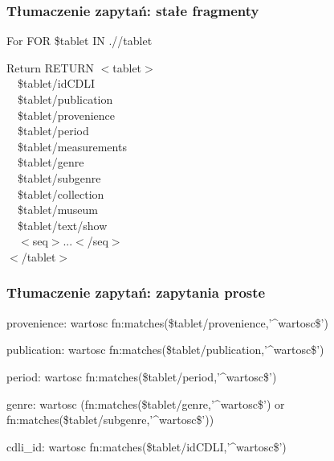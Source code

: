 \begin{frame}
 \frametitle{Tłumaczenie zapytań: stałe fragmenty}
  \begin{block}{For}
	FOR \$tablet IN .//tablet
\end{block}
  \begin{block}{Return}
    RETURN $<$tablet$>$\\
~~{\$tablet/idCDLI}\\
~~{\$tablet/publication}\\
~~{\$tablet/provenience}\\
~~{\$tablet/period}\\
~~{\$tablet/measurements}\\
~~{\$tablet/genre}\\
~~{\$tablet/subgenre}\\
~~{\$tablet/collection}\\
~~{\$tablet/museum}\\
~~{\$tablet/text/show}\\
~~$<$seq$>$...$<$/seq$>$\\
$<$/tablet$>$
\end{block}
\end{frame}

\begin{frame}
	 \frametitle{Tłumaczenie zapytań: zapytania proste}
	\begin{block}{provenience: wartosc}
	fn:matches(\$tablet/provenience,'\textasciicircum wartosc\$')
	\end{block}

	\begin{block}{publication: wartosc}
	fn:matches(\$tablet/publication,'\textasciicircum wartosc\$')
	\end{block}

	\begin{block}{period: wartosc}
	fn:matches(\$tablet/period,'\textasciicircum wartosc\$')
	\end{block}

	\begin{block}{genre: wartosc}
	(fn:matches(\$tablet/genre,'\textasciicircum wartosc\$') or fn:matches(\$tablet/subgenre,'\textasciicircum wartosc\$'))
	\end{block}

	\begin{block}{cdli\_id: wartosc}
	fn:matches(\$tablet/idCDLI,'\textasciicircum wartosc\$')
	\end{block}
\end{frame}

